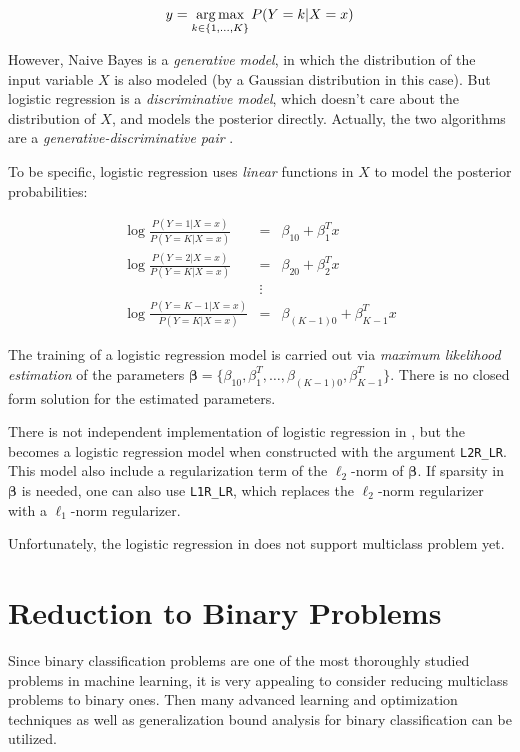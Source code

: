 \[
    y = \operatorname*{arg\,max}_{k\in\{1,\ldots,K\}} P(Y=k|X=x)
\]

However, Naive Bayes is a \emph{generative model}, in which the distribution of
the input variable $X$ is also modeled (by a Gaussian distribution in this
case). But logistic regression is a \emph{discriminative model}, which doesn't
care about the distribution of $X$, and models the posterior directly.
Actually, the two algorithms are a \emph{generative-discriminative pair}
\citep{DBLP:conf/nips/NgJW01}.

To be specific, logistic regression uses \emph{linear} functions in $X$ to model the
posterior probabilities:

\begin{eqnarray}
    \log\frac{P(Y=1|X=x)}{P(Y=K|X=x)} &=& \beta_{10} + \beta_1^Tx \\
    \log\frac{P(Y=2|X=x)}{P(Y=K|X=x)} &=& \beta_{20} + \beta_2^Tx \\
    &\vdots& \nonumber\\
    \log\frac{P(Y=K-1|X=x)}{P(Y=K|X=x)} &=& \beta_{(K-1)0} + \beta_{K-1}^Tx
\end{eqnarray}

The training of a logistic regression model is carried out via \emph{maximum
    likelihood estimation} of the parameters
$\boldsymbol\beta = \{\beta_{10},\beta_1^T,\ldots,\beta_{(K-1)0},\beta_{K-1}^T\}$. There is no
closed form solution for the estimated parameters.

There is not independent implementation of logistic regression in \shogun{}, 
but the  becomes a logistic regression model when
constructed with the argument \Verb|L2R_LR|. This model also include a
regularization term of the $\ell_2$-norm of $\boldsymbol\beta$. If sparsity in
$\boldsymbol\beta$ is needed, one can also use \Verb|L1R_LR|, which replaces
the $\ell_2$-norm regularizer with a $\ell_1$-norm regularizer.

Unfortunately, the logistic regression in \shogun{} does not support multiclass
problem yet.

\section{Reduction to Binary Problems}
\label{sec:multiclass-reduction}

Since binary classification problems are one of the most thoroughly studied
problems in machine learning, it is very appealing to consider reducing
multiclass problems to binary ones. Then many advanced learning and
optimization techniques as well as generalization bound analysis for binary
classification can be utilized.


